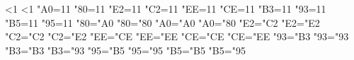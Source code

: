 %
%
%
%
%
\begingroup 			%
\ifx{}\undefined \else
        \ifnum{}<1 \fi\fi<1
  \let\x=\endgroup
\else
  \def\x{\endgroup
\ifx\XeTeXversion\undefined
%
%
\catcode"A0=11 \catcode"80=11 %
\catcode"E2=11 \catcode"C2=11 %
%
\catcode"EE=11 \catcode"CE=11 %
%
\catcode"B3=11 \catcode"93=11 %
\catcode"B5=11 \catcode"95=11 %
%
\lccode"80="A0 \uccode"80="80  \lccode"A0="A0 \uccode"A0="80 %
\lccode"E2="C2 \uccode"E2="E2  \lccode"C2="C2 \uccode"C2="E2 %
%
\lccode"EE="CE \uccode"EE="EE  \lccode"CE="CE \uccode"CE="EE
%
\lccode"93="B3 \uccode"93="93  \lccode"B3="B3 \uccode"B3="93
\lccode"95="B5 \uccode"95="95  \lccode"B5="B5 \uccode"B5="95
\fi
}
\fi
\x

